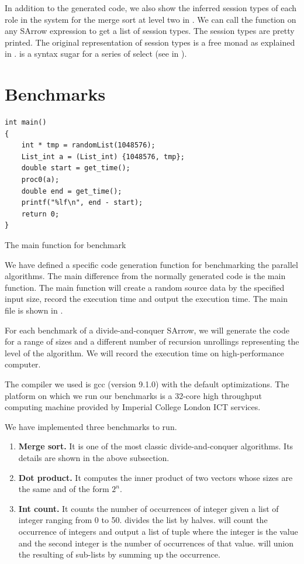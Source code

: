 In addition to the generated code, we also show the inferred session types of each role in the system for the merge sort at level two in . We can call the function  on any SArrow expression to get a list of session types. The session types are pretty printed. The original representation of session types is a free monad as explained in .  is a syntax sugar for a series of select (see in ).

\section{Benchmarks}
\begin{listing}[ht]
\begin{verbatim}
int main()
{
    int * tmp = randomList(1048576);
    List_int a = (List_int) {1048576, tmp};
    double start = get_time();
    proc0(a);
    double end = get_time();
    printf("%lf\n", end - start);
    return 0;
}
\end{verbatim}
    \caption{The main function for benchmark}
    \label{eval:code:main}
\end{listing}
We have defined a specific code generation function for benchmarking the parallel algorithms. The main difference from the normally generated code is the main function. The main function will create a random source data by the specified input size, record the execution time and output the execution time. The main file is shown in . 

For each benchmark of a divide-and-conquer SArrow, we will generate the code for a range of sizes and a different number of recursion unrollings representing the level of the algorithm. We will record the execution time on high-performance computer.

The compiler we used is gcc (version 9.1.0) with the default optimizations. The platform on which we run our benchmarks is a 32-core high throughput computing machine provided by Imperial College London ICT services.

We have implemented three benchmarks to run.
\begin{enumerate}
    \item \textbf{Merge sort. } It is one of the most classic divide-and-conquer algorithms. Its details are shown in the above subsection.
    \item \textbf{Dot product. } It computes the inner product of two vectors whose sizes are the same and of the form $2^n$.
    \item \textbf{Int count. } It counts the number of occurrences of integer given a list of integer ranging from 0 to 50.  divides the list by halves.  will count the occurrence of integers and output a list of tuple where the integer is the value and the second integer is the number of occurrences of that value.  will union the resulting of sub-lists by summing up the occurrence.
\end{enumerate}
